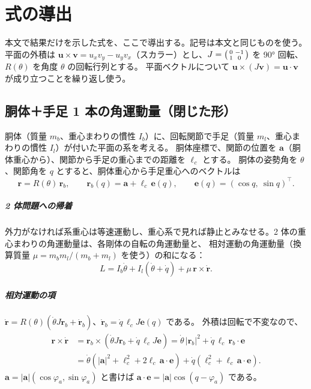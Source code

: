 \chapter{式の導出}\label{app:deriv}

本文で結果だけを示した式を、ここで導出する。記号は本文と同じものを使う。
平面の外積は $\bm u\times\bm v = u_xv_y-u_yv_x$（スカラー）とし、$J=\begin{psmallmatrix}0&-1\\1&0\end{psmallmatrix}$ を 90° 回転、$R(\theta)$ を角度 $\theta$ の回転行列とする。
平面ベクトルについて $\bm u\times(J\bm v)=\bm u\cdot\bm v$ が成り立つことを繰り返し使う。

\section{胴体＋手足 1 本の角運動量（閉じた形）}\label{app:twobody}

胴体（質量 $m_b$、重心まわりの慣性 $I_b$）に、回転関節で手足（質量 $m_l$、重心まわりの慣性 $I_l$）が付いた平面の系を考える。
胴体座標で、関節の位置を $\bm a$（胴体重心から）、関節から手足の重心までの距離を $\ell_c$ とする。
胴体の姿勢角を $\theta$、関節角を $q$ とすると、胴体重心から手足重心へのベクトルは
\begin{equation}
\bm r = R(\theta)\,\bm r_b,\qquad \bm r_b(q) = \bm a + \ell_c\,\bm e(q),\qquad \bm e(q)=(\cos q,\ \sin q)^\top .
\end{equation}

\paragraph{2 体問題への帰着}
外力がなければ系重心は等速運動し、重心系で見れば静止とみなせる。2 体の重心まわりの角運動量は、各剛体の自転の角運動量と、
相対運動の角運動量（換算質量 $\mu = m_bm_l/(m_b+m_l)$ を使う）の和になる：
\begin{equation}
L = I_b\dot\theta + I_l(\dot\theta+\dot q) + \mu\,\bm r\times\dot{\bm r}.
\end{equation}

\paragraph{相対運動の項}
$\dot{\bm r} = R(\theta)\left(\dot\theta J\bm r_b + \dot{\bm r}_b\right)$、$\dot{\bm r}_b = \dot q\,\ell_c J\bm e(q)$ である。
外積は回転で不変なので、
\begin{align}
\bm r\times\dot{\bm r} &= \bm r_b\times\left(\dot\theta J\bm r_b + \dot q\,\ell_c J\bm e\right)
 = \dot\theta\,|\bm r_b|^2 + \dot q\,\ell_c\,\bm r_b\cdot\bm e \\
&= \dot\theta\left(|\bm a|^2+\ell_c^2+2\ell_c\,\bm a\cdot\bm e\right) + \dot q\left(\ell_c^2+\ell_c\,\bm a\cdot\bm e\right).
\end{align}
$\bm a = |\bm a|(\cos\varphi_a,\sin\varphi_a)$ と書けば $\bm a\cdot\bm e = |\bm a|\cos(q-\varphi_a)$ である。

